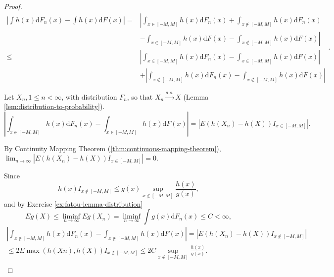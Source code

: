 \begin{proof}
	\begin{equation*}
		\begin{aligned}
			\left|\int h(x)\mathrm{d}F_{n}(x)-\int h(x)\mathrm{d}F(x)\right| = & \left|{\int_{x\in[-M,M]}h(x)\mathrm{d}F_{n}(x)+\int_{x\notin[-M,M]}h(x)\mathrm{d}F_{n}(x)}\right. \\
			                                                                   & \left.{-\int_{x\in[-M,M]}h(x)\mathrm{d}F(x)-\int_{x\notin[-M,M]}h(x)\mathrm{d}F(x)}\right|        \\
			\leq                                                               & \left|\int_{x\in[-M,M]}h(x)\mathrm{d}F_{n}(x)-\int_{x\in[-M,M]}h(x)\mathrm{d}F(x)\right|          \\
			                                                                   & + \left|\int_{x\notin[-M,M]}h(x)\mathrm{d}F_{n}(x)-\int_{x\notin[-M,M]}h(x)\mathrm{d}F(x)\right|
		\end{aligned}.
	\end{equation*}

	Let $X_n,1\leq n<\infty$, with distribution $F_n$, so that $X_n\stackrel{a.s.}{\rightarrow}X$ (Lemma \ref{lem:distribution-to-probability}).
	\begin{equation*}
		\left|\int_{x\in[-M,M]}h(x)\mathrm{d}F_{n}(x)-\int_{x\in[-M,M]}h(x)\mathrm{d}F(x)\right| = \left|E\left(h(X_n)-h(X)\right)I_{x\in[-M,M]}\right|.
	\end{equation*}

	By Continuity Mapping Theorem (\ref{thm:continuous-mapping-theorem}), $\lim_{n\rightarrow\infty}\left|E\left(h(X_n)-h(X)\right)I_{x\in[-M,M]}\right| = 0$.

	Since
	\begin{equation*}
		h(x)I_{x\notin[-M,M]}\leq g(x)\sup_{x\notin[-M,M]}\frac{h(x)}{g(x)},
	\end{equation*}
	and by Exercise \ref{ex:fatou-lemma-distribution}
	\begin{equation*}
		Eg(X) \leq \liminf_{n\rightarrow\infty}Eg(X_n)=\liminf_{n\rightarrow\infty}\int g(x)\mathrm{d}F_{n}(x)\leq C<\infty,
	\end{equation*}
	\begin{equation*}
		\begin{aligned}
			\left|\int_{x\notin[-M,M]}h(x)\mathrm{d}F_{n}(x)-\int_{x\notin[-M,M]}h(x)\mathrm{d}F(x)\right| = \left|E\left(h(X_n)-h(X)\right)I_{x\notin[-M,M]}\right| \\
			\leq 2E\max(h(Xn),h(X))I_{x\notin[-M,M]}\leq 2C\sup_{x\notin[-M,M]}\frac{h(x)}{g(x)}.                                                                    \\
		\end{aligned}
	\end{equation*}


\end{proof}
